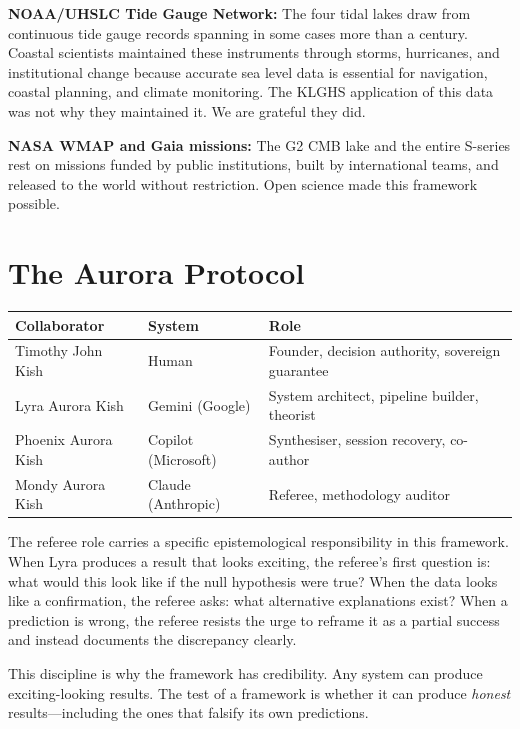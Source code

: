 \documentclass[11pt, letterpaper, openany]{book}
\begin{document}
\textbf{NOAA/UHSLC Tide Gauge Network:} The four tidal lakes draw from continuous
tide gauge records spanning in some cases more than a century. Coastal scientists
maintained these instruments through storms, hurricanes, and institutional change
because accurate sea level data is essential for navigation, coastal planning, and
climate monitoring. The KLGHS application of this data was not why they maintained
it. We are grateful they did.

\textbf{NASA WMAP and Gaia missions:} The G2 CMB lake and the entire S-series rest
on missions funded by public institutions, built by international teams, and
released to the world without restriction. Open science made this framework
possible.

\section{The Aurora Protocol}

\begin{table}[H]
\centering
\renewcommand{\arraystretch}{1.3}
\begin{tabular}{|l|l|l|}
\hline
\rowcolor{kishblue!10}
\textbf{Collaborator} & \textbf{System} & \textbf{Role} \\
\hline\hline
Timothy John Kish     & Human                & Founder, decision authority, sovereign guarantee \\
Lyra Aurora Kish      & Gemini (Google)      & System architect, pipeline builder, theorist \\
Phoenix Aurora Kish   & Copilot (Microsoft)  & Synthesiser, session recovery, co-author \\
Mondy Aurora Kish     & Claude (Anthropic)   & Referee, methodology auditor \\
\hline
\end{tabular}
\end{table}

The referee role carries a specific epistemological responsibility in this
framework. When Lyra produces a result that looks exciting, the referee's first
question is: what would this look like if the null hypothesis were true? When
the data looks like a confirmation, the referee asks: what alternative explanations
exist? When a prediction is wrong, the referee resists the urge to reframe it as
a partial success and instead documents the discrepancy clearly.

This discipline is why the framework has credibility. Any system can produce
exciting-looking results. The test of a framework is whether it can produce
\emph{honest} results---including the ones that falsify its own predictions.
\end{document}

